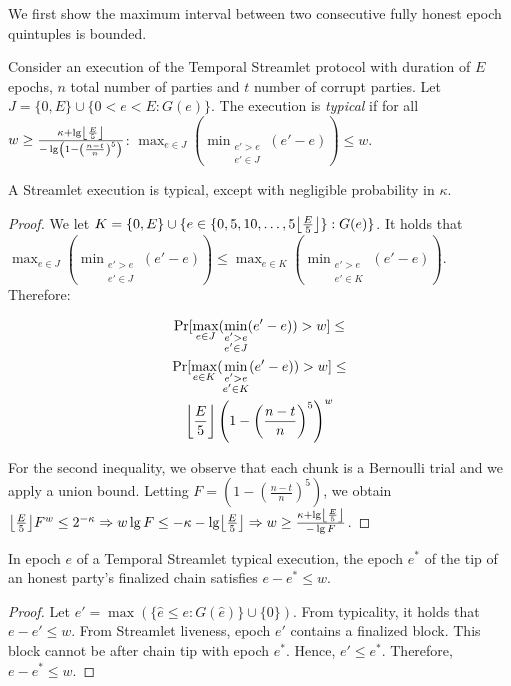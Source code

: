 We first show the maximum interval between two consecutive fully honest epoch quintuples
is bounded.

\begin{definition}
  Consider an execution of the Temporal Streamlet protocol with duration
  of $E$ epochs, $n$ total number of parties and $t$ number of corrupt parties.
  Let $J = \{0,E\} \cup \{0 < e < E: G(e)\}$.
  The execution is \emph{typical} if for all
  $w \geq \frac{\kappa + \lg \floor*{\frac{E}{5}}}{- \lg \left(1 - \left(\frac{n - t}{n}\right)^5\right)}$:
  $\max_{e \in J}(\min_{\substack{e' > e \\ e' \in J}}(e' - e)) \leq w$.
\end{definition}

\begin{lemma} \label{lem:honest-quintuple}
  A Streamlet execution is typical, except with negligible probability in $\kappa$.
\end{lemma}
\begin{proof}
  We let $K = \{0, E\} \cup \{e \in \{0, 5, 10 ,\ldots, 5\floor*{\frac{E}{5}}\}: G(e)\}$.
  It holds that
  $\max_{e \in J}(\min_{\substack{e' > e \\ e' \in J}}(e' - e)) \leq \max_{e \in K}(\min_{\substack{e' > e \\ e' \in K}}(e' - e))$.
  Therefore:

  \begin{gather*}
      \Pr [\max_{e \in J}(\min_{\substack{e' > e \\ e' \in J}}(e' - e)) > w] \leq \\
      \Pr [\max_{e \in K}(\min_{\substack{e' > e \\ e' \in K}}(e' - e)) > w] \leq \\
      \floor*{\frac{E}{5}} \left(1 - \left(\frac{n - t}{n}\right)^5\right)^w
  \end{gather*}

  For the second inequality, we observe that each chunk is a Bernoulli trial and we
  apply a union bound.
  Letting $F = \left(1 - \left(\frac{n - t}{n}\right)^5\right)$, we obtain
  $\floor*{\frac{E}{5}} F^w \leq 2^{-\kappa} \Rightarrow
   w \lg F \leq -\kappa - \lg \floor*{\frac{E}{5}} \Rightarrow
   w \geq \frac{\kappa + \lg \floor*{\frac{E}{5}}}{- \lg F}
  $.
  \Qed
\end{proof}

\begin{lemma} \label{lem:latest-finalized-round}
  In epoch $e$ of a Temporal Streamlet typical execution,
  the epoch $e^*$ of the tip of an honest party's finalized chain
  satisfies $e - e^* \leq w$.
\end{lemma}
\begin{proof}
  Let $e' = \max(\{\hat e \leq e: G(\hat e)\} \cup \{0\})$.
  From typicality, it holds that $e - e' \leq w$.
  From Streamlet liveness, epoch $e'$ contains a finalized
  block. This block cannot be after chain tip with epoch $e^*$.
  Hence, $e' \leq e^*$. Therefore, $e - e^* \leq w$.
  \Qed
\end{proof}


